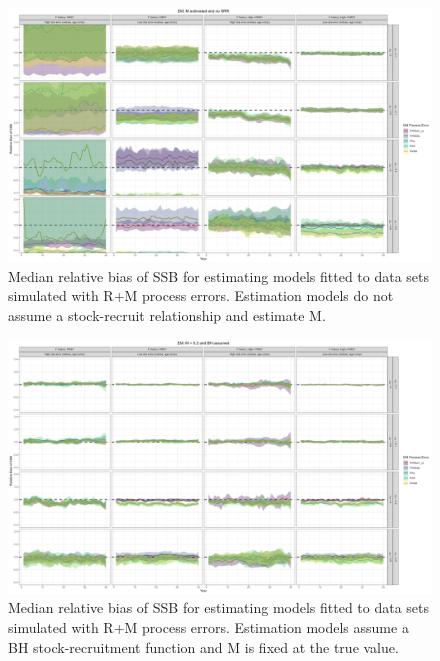 \documentclass[
  12pt,
]{article}
\begin{document}
\begin{landscape}
\begin{figure}
\caption{Median relative bias of SSB for estimating models fitted to data sets simulated with R+M process errors. Estimation models do not assume a stock-recruit relationship and estimate M.}\label{M_om_em_R_ME_relbias_ssb}
\begin{center}
\includegraphics[width = \textwidth]{M_om_R_ME_relbias_ssb.png}
\end{center}
\end{figure}
\end{landscape}

\begin{landscape}
\begin{figure}
\caption{Median relative bias of SSB for estimating models fitted to data sets simulated with R+M process errors. Estimation models assume a BH stock-recruitment function and M is fixed at the true value.}\label{M_om_em_BH_MF_relbias_ssb}
\begin{center}
\includegraphics[width = \textwidth]{M_om_BH_MF_relbias_ssb.png}
\end{center}
\end{figure}
\end{landscape}
\end{document}

